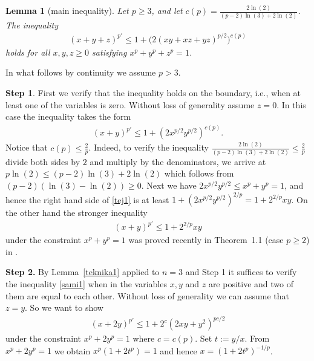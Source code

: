 \documentclass[11pt]{article}
\newtheorem{lemma}[theorem]{Lemma}
\theoremstyle{definition}
\newcommand{\1}{\mathbf{1}}
\begin{document}
      
\begin{lemma}[main inequality]\label{axali1}
Let $p\geq 3$, and let $c(p) = \frac{2\ln(2)}{(p-2)\ln(3)+2\ln(2)}$. The inequality 
\begin{align}\label{sami1}
(x+y+z)^{p'} \leq 1+\Big(2(xy+xz+yz)^{p/2}\Big)^{c(p)}  
\end{align}
holds for all $x,y,z\geq 0$ satisfying $x^{p}+y^{p}+z^{p}=1$.
\end{lemma}

In what follows by continuity we assume $p>3$.  




\medskip
\noindent\textbf{Step 1}. First we verify that the inequality holds on the boundary, i.e., when at least one of the variables is zero. Without loss of generality assume $z=0$. In this case the inequality takes the form 
\begin{align}\label{tej1}
    (x+y)^{p'}\leq 1+(2x^{p/2}y^{p/2})^{c(p)}.
\end{align}
Notice that $c(p) \leq \frac{2}{p}$. Indeed, to verify the inequality $\frac{2\ln(2)}{(p-2)\ln(3)+2\ln(2)} \leq \frac{2}{p}$ divide both sides by $2$ and multiply by the denominators, we arrive at $p \ln(2) \leq (p-2)\ln(3)+2\ln(2)$ which follows from $(p-2)(\ln(3)-\ln(2))\geq 0$. Next we have $2x^{p/2}y^{p/2}\leq x^{p}+y^{p}=1$, and hence the right hand side of \eqref{tej1} is at least $1+(2x^{p/2}y^{p/2})^{2/p} = 1+2^{2/p}xy$. On the other hand the stronger inequality 
\begin{align*}
    (x+y)^{p'}\leq 1+2^{2/p}xy
\end{align*}
under the constraint $x^{p}+y^{p}=1$ was proved recently in Theorem~1.1 (case $p\geq 2$) in \cite{CFIL2021}.


\medskip
\noindent\textbf{Step 2.} By Lemma~\ref{teknika1} applied to $n=3$ and Step 1 it suffices to verify the inequality \eqref{sami1} when in the variables $x,y$ and $z$ are positive and two of them are equal to each other. Without loss of generality we can assume that $z=y$. So we want to show 
\begin{align}\label{sof1}
    (x+2y)^{p'}\leq 1+2^{c}(2xy+y^{2})^{pc/2}
\end{align}
under the constraint $x^{p}+2y^{p}=1$ where $c=c(p)$. Set $t := y/x$. From $x^{p}+2y^{p}=1$ we obtain $x^{p}(1+2t^{p})=1$ and hence $x= (1+2t^{p})^{-1/p}$. 
\end{document}
